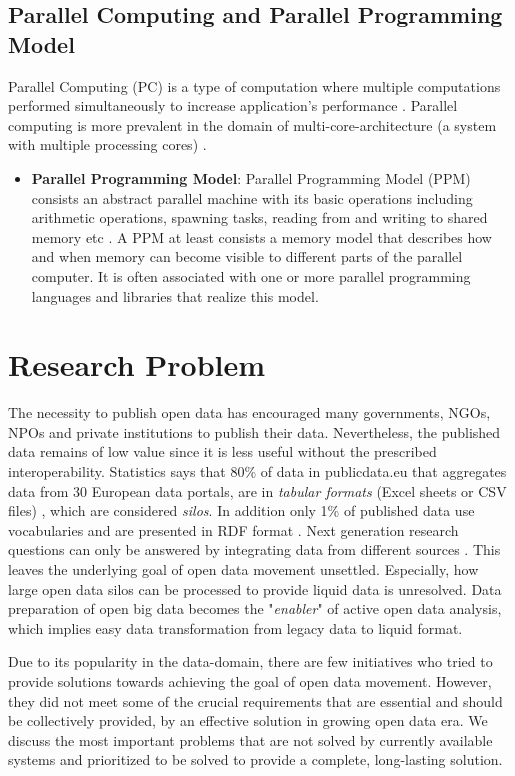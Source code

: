 \subsection{Parallel Computing and Parallel Programming Model}
Parallel Computing (PC) is a type of computation where multiple computations performed simultaneously to increase application's performance \cite{parallelprg} . Parallel computing is more prevalent in the domain of multi-core-architecture (a system with multiple processing cores) . 
\begin{itemize}
\item \textbf{Parallel Programming Model}: Parallel Programming Model (PPM) consists an abstract parallel machine with its basic operations including arithmetic operations, spawning tasks, reading from and writing to shared memory etc \cite{PPM}. A PPM at least consists a memory model that describes how and when memory can become visible to different parts of the parallel computer. It is often associated with one or more parallel programming languages and libraries that realize this model.
\end{itemize}

\section{Research Problem}
\label{sec:problem}
 \noindent The necessity to publish open data has encouraged many governments, NGOs, NPOs and private institutions to publish their data. Nevertheless, the published data remains of low value since it is less useful without the prescribed interoperability. Statistics says that 80\% of data in publicdata.eu that aggregates data from 30 European data portals, are in\textit{ tabular formats} (Excel sheets or CSV files) \cite{nemreport}, which are considered \textit{silos}. In addition only 1\% of published data use vocabularies and are presented in RDF format \cite{nemreport}. Next generation research questions can only be answered by integrating data from different sources \cite{nemreport}. This leaves the underlying goal of open data movement unsettled. Especially, how large open data silos can be processed to provide liquid data is unresolved. Data preparation of open big data  becomes the "\textit{enabler}" of active open data analysis, which implies easy data transformation from legacy data to liquid format. 

Due to its popularity in the data-domain, there are few initiatives who tried to provide solutions towards achieving the goal of open data movement. However, they did not meet some of the crucial requirements that are essential and should be collectively provided, by an effective solution in growing open data era. We discuss the most important problems that are not solved by currently available systems and prioritized to be solved to provide a complete, long-lasting solution. 

